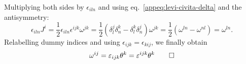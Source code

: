 \begin{mdframed}
\begin{innerproof}
    Multiplying both sides by $\epsilon_{iln}$ and using eq.~\eqref{appeq:levi-civita-delta} and the antisymmetry:
    \begin{equation*}
        \epsilon_{iln} J^i = \frac{1}{2} \epsilon_{iln} \epsilon^{ijk} \omega^{jk} = \frac{1}{2} ( \delta^j_l \delta^k_n - \delta^k_l \delta^j_n ) \omega^{jk} = \frac{1}{2} (\omega^{ln} - \omega^{nl}) = \omega^{ln} .
    \end{equation*}
    Relabelling dummy indices and using $\epsilon_{ijk} = \epsilon_{kij}$, we finally obtain
    \begin{equation*}
        \omega^{ij} = \epsilon_{ijk} \theta^k = \epsilon^{ijk} \theta^k \qedhere
    \end{equation*}
\end{innerproof}
\end{mdframed}
